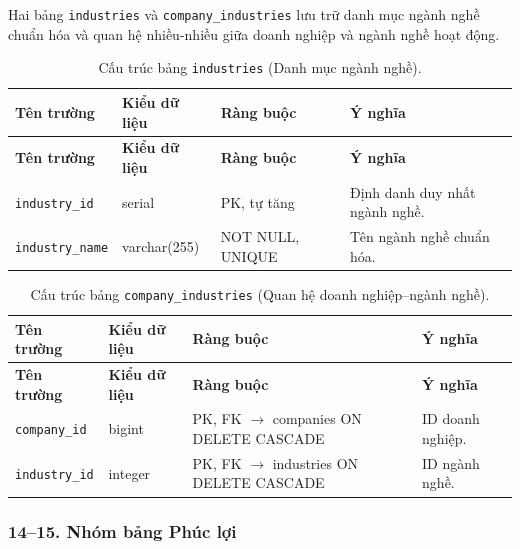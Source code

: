 Hai bảng \texttt{industries} và \texttt{company\_\allowbreak industries} lưu trữ danh mục ngành nghề chuẩn hóa và quan hệ nhiều-nhiều giữa doanh nghiệp và ngành nghề hoạt động.

\begin{footnotesize}\begin{longtable}{|L{3.5cm}|L{2.0cm}|L{3.0cm}|L{5.5cm}|}
\caption{Cấu trúc bảng \texttt{industries} (Danh mục ngành nghề).}
\label{tab:industries} \\
\hline
\textbf{Tên trường} & \textbf{Kiểu dữ liệu} & \textbf{Ràng buộc} & \textbf{Ý nghĩa} \\
\hline
\endfirsthead
\hline
\textbf{Tên trường} & \textbf{Kiểu dữ liệu} & \textbf{Ràng buộc} & \textbf{Ý nghĩa} \\
\hline
\endhead
\texttt{industry\_id} & serial & PK, tự tăng & Định danh duy nhất ngành nghề. \\
\hline
\texttt{industry\_name} & varchar(255) & NOT NULL, UNIQUE & Tên ngành nghề chuẩn hóa. \\
\hline
\end{longtable}
\end{footnotesize}

\begin{footnotesize}\begin{longtable}{|L{3.5cm}|L{2.0cm}|L{3.0cm}|L{5.5cm}|}
\caption{Cấu trúc bảng \texttt{company\_\allowbreak industries} (Quan hệ doanh nghiệp--ngành nghề).}
\label{tab:company_industries} \\
\hline
\textbf{Tên trường} & \textbf{Kiểu dữ liệu} & \textbf{Ràng buộc} & \textbf{Ý nghĩa} \\
\hline
\endfirsthead
\hline
\textbf{Tên trường} & \textbf{Kiểu dữ liệu} & \textbf{Ràng buộc} & \textbf{Ý nghĩa} \\
\hline
\endhead
\texttt{company\_id} & bigint & PK, FK $\rightarrow$ companies ON DELETE CASCADE & ID doanh nghiệp. \\
\hline
\texttt{industry\_id} & integer & PK, FK $\rightarrow$ industries ON DELETE CASCADE & ID ngành nghề. \\
\hline
\end{longtable}
\end{footnotesize}

\subsubsection*{14--15. Nhóm bảng Phúc lợi}


